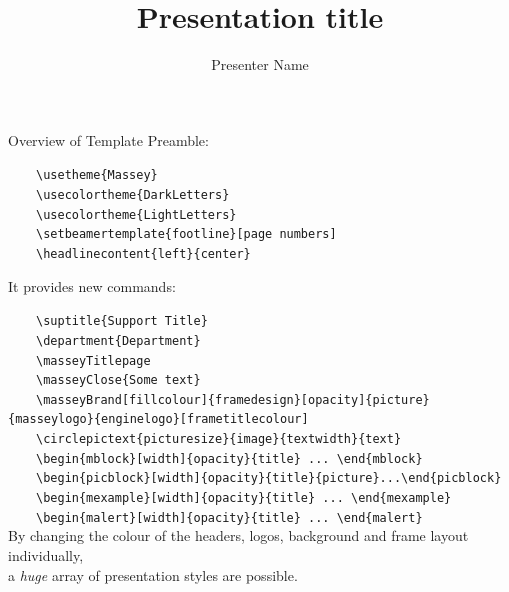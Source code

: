 \documentclass[10pt,aspectratio=169]{beamer}
\title[Short title not used by massey template]{Presentation title}
\author{Presenter Name}
\institute{Institute of Fundamental Science}
\date{\nztoday}
\begin{document}
\masseyBrand{}{}{}{}{}

\begin{frame}[fragile]{}{Overview of Template}
\setlength\parskip{2ex}
\vspace*{-13ex}
Preamble:

~~~~\verb|\usetheme{Massey}|\\
~~~~\verb|\usecolortheme{DarkLetters}|\\
~~~~\verb|\usecolortheme{LightLetters}|\\
~~~~\verb|\setbeamertemplate{footline}[page numbers]|\\
~~~~\verb|\headlinecontent{left}{center}|

It provides new commands:

\footnotesize
~~~~\verb|\suptitle{Support Title}|\\
~~~~\verb|\department{Department}|\\
~~~~\verb|\masseyTitlepage|\\
~~~~\verb|\masseyClose{Some text}|\\
~~~~\verb|\masseyBrand[fillcolour]{framedesign}[opacity]{picture}{masseylogo}{enginelogo}[frametitlecolour]|\\
~~~~\verb|\circlepictext{picturesize}{image}{textwidth}{text}|\\
~~~~\verb|\begin{mblock}[width]{opacity}{title} ... \end{mblock}|\\
~~~~\verb|\begin{picblock}[width]{opacity}{title}{picture}...\end{picblock}|\\
~~~~\verb|\begin{mexample}[width]{opacity}{title} ... \end{mexample}|\\
~~~~\verb|\begin{malert}[width]{opacity}{title} ... \end{malert}|\\

\vspace{3ex}
\color{masseyRuapehu}
By changing the colour of the headers, logos, background and frame layout individually,\\ a \textsl{huge} array of presentation styles are possible.

\end{frame}
\end{document}
